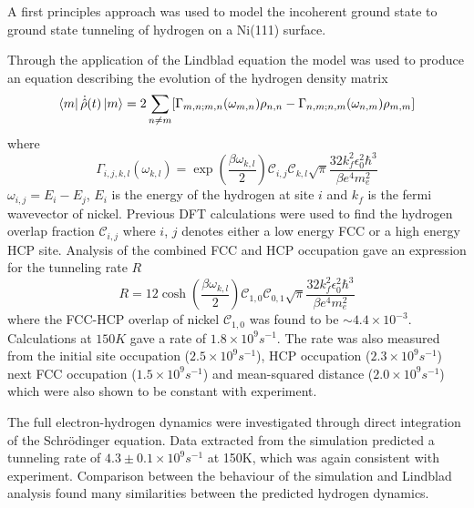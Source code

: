 A first principles
approach was used to
model the incoherent ground state to
ground state tunneling of
hydrogen on a Ni(111) surface. %

Through the application of the
Lindblad equation the model
was used to produce an
equation describing the
evolution of the
hydrogen density matrix
\begin{equation}
    \bra{m}\dot{\hat{\rho}}(t) \ket{m}  =
    2 \sum_{n\neq m}
    [  \Gamma_{m,n;m, n}(\omega_{m,n})\rho_{n, n}
        - \Gamma_{n,m;n, m}(\omega_{n,m})\rho_{m, m}]
\end{equation}
where
\begin{equation}
    \Gamma_{i,j, k,l}(\omega_{k,l})   =
    \exp{(\frac{\beta \omega_{k,l}}{2})}
    \mathcal{C}_{i,j} \mathcal{C}_{k,l}
    \sqrt{\pi} \frac{32 k_f^2 \epsilon_0^2 \hbar^3}{\beta e^4 m_e^2}
\end{equation}
\(\omega_{i,j} = E_i - E_j\),
\(E_i\) is the energy of the hydrogen at
site \(i\) and \(k_f\) is the fermi wavevector
of nickel. Previous DFT calculations
were used to find the hydrogen
overlap fraction
\(\mathcal{C}_{i,j}\) where
\(i\), \(j\) denotes either
a low energy FCC or a
high energy HCP site.
Analysis of the combined FCC and HCP
occupation gave an expression
for the tunneling rate \(R\)
\begin{equation}
    R   =
    12\cosh{(\frac{\beta \omega_{k,l}}{2})}
    \mathcal{C}_{1,0}\mathcal{C}_{0,1}
    \sqrt{\pi} \frac{32 k_f^2 \epsilon_0^2 \hbar^3}{\beta e^4 m_e^2}
\end{equation}
where the FCC-HCP
overlap of nickel
\(\mathcal{C}_{1,0}\)
was found to be \(\sim 4.4\times{}10^{-3}\). %
Calculations at
\(150K\) gave a rate of
\(1.8\times 10^9s^{-1}\).
The rate was also measured
from the initial site
occupation (\(2.5\times 10^{9}s^{-1}\)), HCP occupation
(\(2.3\times 10^{9}s^{-1}\))
next FCC occupation
(\(1.5\times 10^{9}s^{-1}\))
and mean-squared distance
(\(2.0\times{} 10^9s^{-1}\))
which were also shown to be constant
with experiment.

The full electron-hydrogen
dynamics were investigated
through direct integration
of the Schrödinger equation.
Data extracted from the simulation
predicted a tunneling rate of
\(4.3\pm 0.1\times10^{9}s^{-1}\)
at 150K,
which was again
consistent with
experiment. Comparison
between the behaviour
of the simulation
and Lindblad analysis
found many similarities
between the
predicted
hydrogen dynamics.